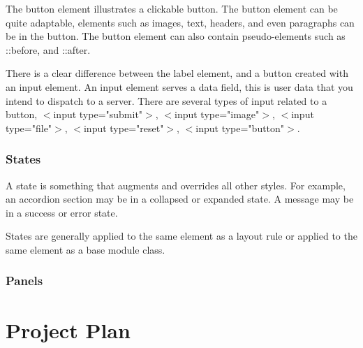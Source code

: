 The button element illustrates a clickable button. The button element can be quite adaptable, elements such as images, text, headers, and even paragraphs can be in the button. The button element can also contain pseudo-elements such as ::before, and ::after. 

There is a clear difference between the label element, and a button created with an input element. An input element serves a data field, this is user data that you intend to dispatch to a server. There are several types of input related to a button, $<$input type="submit"$>$, $<$input type="image"$>$, $<$input type="file"$>$, $<$input type="reset"$>$, $<$input type="button"$>$. 

\subsection{States}

A state is something that augments and overrides all other styles. For example, an accordion section may be in a collapsed or expanded state. A message may be in a success or error state.

States are generally applied to the same element as a layout rule or applied to the same element as a base module class.
\subsection{Panels}

\newpage
\chapter*{Project Plan}
